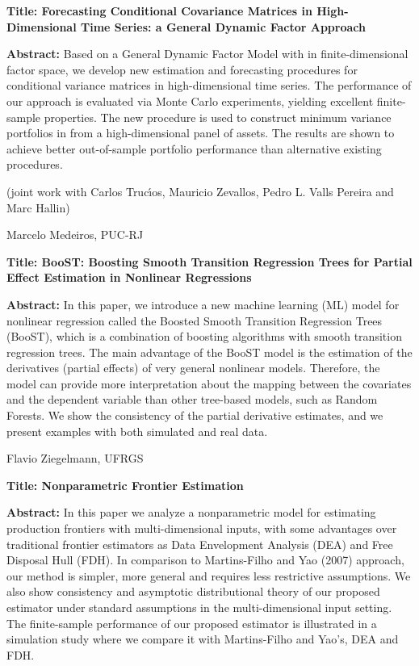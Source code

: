 \documentclass[11pt]{article}
\begin{document}

{\bf Title: Forecasting Conditional Covariance Matrices in
  High-Dimensional Time Series: a General Dynamic Factor Approach}

{\bf Abstract:} Based on a General Dynamic Factor Model with in
finite-dimensional factor space, we develop new estimation and
forecasting procedures for conditional variance matrices in
high-dimensional time series. The performance of our approach is
evaluated via Monte Carlo experiments, yielding excellent
finite-sample properties. The new procedure is used to construct
minimum variance portfolios in from a high-dimensional panel of
assets. The results are shown to achieve better out-of-sample
portfolio performance than alternative existing procedures.

(joint work with Carlos Truc\'{\i}os, Mauricio Zevallos, Pedro L.
Valls Pereira and Marc Hallin)

\newpage

{\large \sc Marcelo Medeiros, PUC-RJ}


{\bf Title: BooST: Boosting Smooth Transition Regression Trees for
  Partial Effect Estimation in Nonlinear Regressions}

{\bf Abstract:} In this paper, we introduce a new machine learning
(ML) model for nonlinear regression called the Boosted Smooth
Transition Regression Trees (BooST), which is a combination of
boosting algorithms with smooth transition regression trees. The main
advantage of the BooST model is the estimation of the derivatives
(partial effects) of very general nonlinear models. Therefore, the
model can provide more interpretation about the mapping between the
covariates and the dependent variable than other tree-based models,
such as Random Forests. We show the consistency of the partial
derivative estimates, and we present examples with both simulated and
real data.

\newpage

{\large \sc Flavio Ziegelmann, UFRGS}


{\bf Title: Nonparametric Frontier Estimation}

{\bf Abstract:} In this paper we analyze a nonparametric model for
estimating production frontiers with multi-dimensional inputs, with
some advantages over traditional frontier estimators as Data
Envelopment Analysis (DEA) and Free Disposal Hull (FDH).  In
comparison to Martins-Filho and Yao (2007) approach, our method is
simpler, more general and requires less restrictive assumptions. We
also show consistency and asymptotic distributional theory of our
proposed estimator under standard assumptions in the multi-dimensional
input setting. The finite-sample performance of our proposed estimator
is illustrated in a simulation study where we compare it with
Martins-Filho and Yao's, DEA and FDH.
\end{document}
